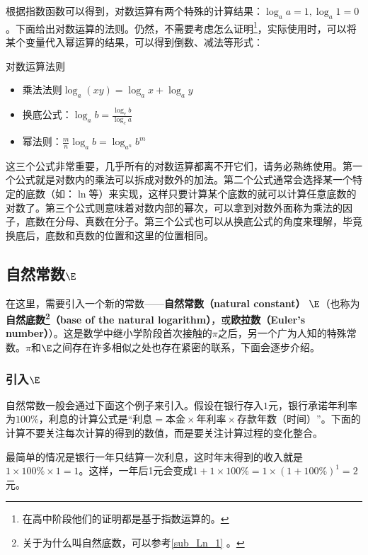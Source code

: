 根据指数函数可以得到，对数运算有两个特殊的计算结果：$\log_a a=1,\log_a1=0$。下面给出对数运算的法则。仍然，不需要考虑怎么证明\footnote{在高中阶段他们的证明都是基于指数运算的。}，实际使用时，可以将某个变量代入幂运算的结果，可以得到倒数、减法等形式：

\begin{theorem}{对数运算法则}
\begin{itemize}
\item 乘法法则$\log_a(xy)=\log_ax+\log_ay$
\item 换底公式：$\displaystyle \log_a b=\frac{\log_cb}{\log_ca}$
\item 幂法则：$\displaystyle \frac{m}{n}\log_a b=\log_{a^n} b^m$
\end{itemize}
\end{theorem}

这三个公式非常重要，几乎所有的对数运算都离不开它们，请务必熟练使用。第一个公式就是对数内的乘法可以拆成对数外的加法。第二个公式通常会选择某一个特定的底数（如：$\ln$等）来实现，这样只要计算某个底数的就可以计算任意底数的对数了。第三个公式则意味着对数内部的幂次，可以拿到对数外面称为乘法的因子，底数在分母、真数在分子。第三个公式也可以从换底公式的角度来理解，毕竟换底后，底数和真数的位置和这里的位置相同。

\subsection{自然常数$\E$}

在这里，需要引入一个新的常数——\textbf{自然常数（natural constant）} $\E$（也称为\textbf{自然底数\footnote{关于为什么叫自然底数，可以参考\autoref{sub_Ln_1} 。}（base of the natural logarithm）}，或\textbf{欧拉数（Euler’s number）}）。这是数学中继小学阶段首次接触的$\pi$之后，另一个广为人知的特殊常数。$\pi$和$\E$之间存在许多相似之处也存在紧密的联系，下面会逐步介绍。

\subsubsection{引入$\E$}

自然常数一般会通过下面这个例子来引入。假设在银行存入$1$元，银行承诺年利率为$100\%$，利息的计算公式是“$\text{利息}=\text{本金}\times\text{年利率}\times\text{存款年数（时间）}$”。下面的计算不要关注每次计算的得到的数值，而是要关注计算过程的变化整合。

最简单的情况是银行一年只结算一次利息，这时年末得到的收入就是$1\times100\%\times1=1$。这样，一年后1元会变成$1+1\times100\%=1\times(1+100\%)^1=2$元。

